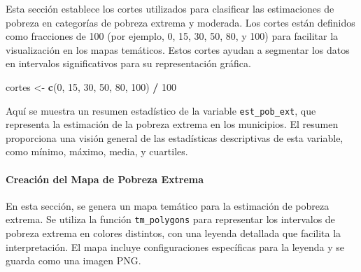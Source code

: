 \documentclass[
  12pt,
]{book}
\newenvironment{Shaded}{\begin{snugshade}}{\end{snugshade}}
\newcommand{\DecValTok}[1]{\textcolor[rgb]{0.00,0.00,0.81}{#1}}
\newcommand{\FunctionTok}[1]{\textcolor[rgb]{0.13,0.29,0.53}{\textbf{#1}}}
\newcommand{\NormalTok}[1]{#1}
\newcommand{\OtherTok}[1]{\textcolor[rgb]{0.56,0.35,0.01}{#1}}
\newcommand{\SpecialCharTok}[1]{\textcolor[rgb]{0.81,0.36,0.00}{\textbf{#1}}}
\begin{document}
Esta sección establece los cortes utilizados para clasificar las estimaciones de pobreza en categorías de pobreza extrema y moderada. Los cortes están definidos como fracciones de 100 (por ejemplo, 0, 15, 30, 50, 80, y 100) para facilitar la visualización en los mapas temáticos. Estos cortes ayudan a segmentar los datos en intervalos significativos para su representación gráfica.

\begin{Shaded}
\begin{Highlighting}[]
\NormalTok{cortes }\OtherTok{\textless{}{-}} \FunctionTok{c}\NormalTok{(}\DecValTok{0}\NormalTok{, }\DecValTok{15}\NormalTok{, }\DecValTok{30}\NormalTok{, }\DecValTok{50}\NormalTok{, }\DecValTok{80}\NormalTok{, }\DecValTok{100}\NormalTok{) }\SpecialCharTok{/} \DecValTok{100}
\end{Highlighting}
\end{Shaded}

Aquí se muestra un resumen estadístico de la variable \texttt{est\_pob\_ext}, que representa la estimación de la pobreza extrema en los municipios. El resumen proporciona una visión general de las estadísticas descriptivas de esta variable, como mínimo, máximo, media, y cuartiles.

\begin{Shaded}
\end{Shaded}

\hypertarget{creaciuxf3n-del-mapa-de-pobreza-extrema}{%
\paragraph*{Creación del Mapa de Pobreza Extrema}\label{creaciuxf3n-del-mapa-de-pobreza-extrema}}

En esta sección, se genera un mapa temático para la estimación de pobreza extrema. Se utiliza la función \texttt{tm\_polygons} para representar los intervalos de pobreza extrema en colores distintos, con una leyenda detallada que facilita la interpretación. El mapa incluye configuraciones específicas para la leyenda y se guarda como una imagen PNG.
\end{document}
